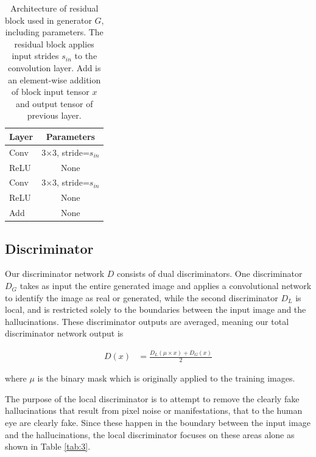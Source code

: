 \documentclass{article}
\begin{document}
\begin{table}[h] 
  \centering  
    \begin{tabular}{lc}  
    \hline
    \textbf{Layer} & \textbf{Parameters}\\ 
    \hline \hline
      Conv & 3$\times$3, stride=$s_{in}$ \\
    \hline
      ReLU & None \\
    \hline
      Conv & 3$\times$3, stride=$s_{in}$ \\
    \hline
      ReLU & None \\
    \hline
      Add & None \\
    \hline
    \end{tabular}
  
  \caption{Architecture of residual block used in generator $G$, including parameters. The residual block applies input strides $s_{in}$ to the convolution layer. Add is an element-wise addition of block input tensor $x$ and output tensor of previous layer.} 
  \label{tab:2}
\end{table}

\subsection{Discriminator}
Our discriminator network $D$ consists of dual discriminators. One discriminator $D_G$ takes as input the entire generated image and applies a convolutional network to identify the image as real or generated, while the second discriminator $D_L$ is local, and is restricted solely to the boundaries between the input image and the hallucinations. These discriminator outputs are averaged, meaning our total discriminator network output is 

\begin{align}
	D(x) &= \frac{D_L(\mu \times x) + D_G(x)}{2}
\end{align}

where $\mu$ is the binary mask which is originally applied to the training images.

The purpose of the local discriminator is to attempt to remove the clearly fake hallucinations that result from pixel noise or manifestations, that to the human eye are clearly fake. Since these happen in the boundary between the input image and the hallucinations, the local discriminator focuses on these areas alone as shown in Table \ref{tab:3}.
\end{document}
